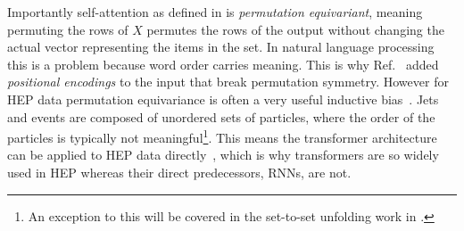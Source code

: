 Importantly self-attention as defined in  is \textit{permutation equivariant}, meaning permuting the rows of $X$ permutes the rows of the output without changing the actual vector representing the items in the set.
In natural language processing this is a problem because word order carries meaning.
This is why Ref.~\cite{Vaswani:2017attention} added \textit{positional encodings} to the input that break permutation symmetry.
However for HEP data permutation equivariance is often a very useful inductive bias~\cite{Komiske:2018cqr}.
Jets and events are composed of unordered sets of particles, where the order of the particles is typically not meaningful\footnote{An exception to this will be covered in the set-to-set unfolding work in .}.
This means the transformer architecture can be applied to HEP data directly~\cite{Mikuni:2020wpr}, which is why transformers are so widely used in HEP whereas their direct predecessors, RNNs, are not.
